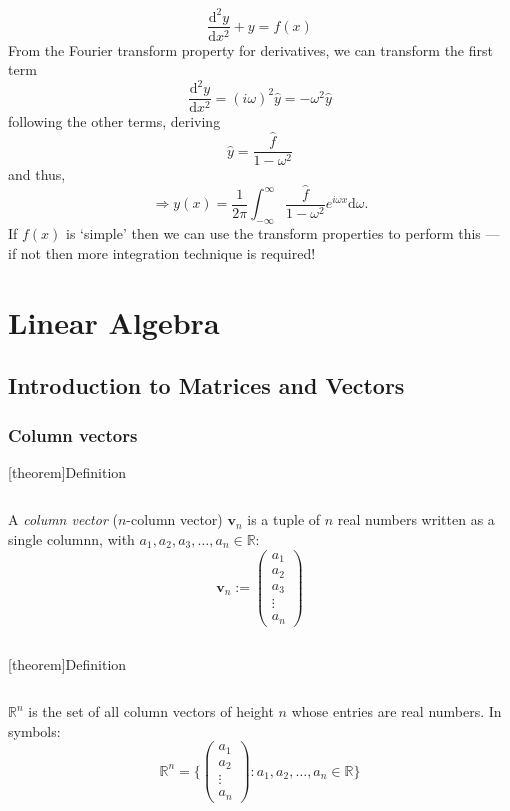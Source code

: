 \documentclass[12pt]{report}
\theoremstyle{definition}
\begin{document}
\begin{ex}
    \[
        \frac{\mathrm{d}^{2}y}{\mathrm{d}x^{2}}+y=f(x)
    \]
    From the Fourier transform property for derivatives, we can transform the first term\[
        \frac{\mathrm{d}^{2}y}{\mathrm{d}x^{2}} = {(i\omega)}^{2}\hat{y} = -\omega^{2}\hat{y}
    \]
    following the other terms, deriving\[
        \hat{y} = \frac{\hat{f}}{1-\omega^{2}}
    \]and thus,\[
        \Rightarrow{}y(x) = \frac{1}{2\pi}\int_{-\infty}^{\infty} \frac{\hat{f}}{1-\omega^{2}}e^{i\omega x}\mathrm{d}\omega.
    \]
    If $f(x)$ is `simple' then we can use the transform properties to perform this ---
    if not then more integration technique is required!
\end{ex} 






\chapter{Linear Algebra}

\section{Introduction to Matrices and Vectors}

\subsection{Column vectors}

[theorem]{Definition}
\begin{column vector}
    A \emph{column vector} ($n$-column vector) $\mathbf{v}_n$ is a tuple of $n$ real numbers written as a single columnn, 
    with $a_1, a_2, a_3, \ldots, a_n \in \mathbb{R}$:\[
    \mathbf{v}_n := 
    \begin{pmatrix}
        a_1 \\
        a_2 \\
        a_3 \\
        \vdots \\
        a_n
    \end{pmatrix}
    \]
\end{column vector}

[theorem]{Definition}
\begin{set of column vectors}
    $\mathbb{R}^{n}$ is the set of all column vectors of height $n$ whose entries are real numbers.
    In symbols:\[
        \mathbb{R}^{n} = \{
            \begin{pmatrix}
                    a_1\\
                    a_2\\
                    \vdots\\
                    a_n
            \end{pmatrix}
            : a_1, a_2, \ldots, a_n \in \mathbb{R}
        \} 
    \]
\end{set of column vectors}
\end{document}
